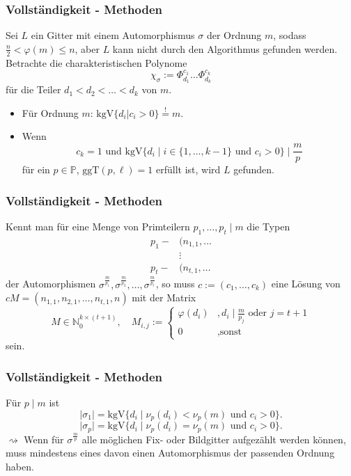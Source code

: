 \documentclass{beamer}
\newcommand{\N}{\mathbb{N}}
\renewcommand{\P}{\mathbb{P}}
\newcommand{\ggT}{\text{ggT}}
\newcommand{\kgV}{\text{kgV}}
\begin{document}
\begin{frame}[plain]
	\frametitle{Vollständigkeit - Methoden}
	Sei $L$ ein Gitter mit einem Automorphismus $\sigma$ der Ordnung $m$, sodass $\frac{n}{2} < \varphi(m) \leq n$, aber $L$ kann nicht durch den Algorithmus gefunden werden.\\
	\pause
	Betrachte die charakteristischen Polynome
	\[\chi_\sigma := \Phi_{d_1}^{c_1} \dots \Phi_{d_k}^{c_k} \]
	für die Teiler $d_1 < d_2 < \dots < d_k$ von $m$.\\
	\pause
	\begin{itemize}
		\item Für Ordnung $m$: $\kgV\lbrace d_i \vert c_i > 0 \rbrace \stackrel{!}{=} m$.\\
		\pause
		\item Wenn
	 		\[c_k = 1 \text{ und } \kgV \lbrace d_i \mid i \in \lbrace 1, \dots, k-1 \rbrace \text{ und } c_i > 0 \rbrace \mid \frac{m}{p}\]
			für ein $p \in \P$, $\ggT(p, \ell) = 1$ erfüllt ist, wird $L$ gefunden.
	\end{itemize}
\end{frame}

\begin{frame}[plain]
	\frametitle{Vollständigkeit - Methoden}
	Kennt man für eine Menge von Primteilern $p_1, \dots, p_t \mid m$ die Typen
	\begin{align*}
		p_1 - &(n_{1,1}, \dots\\
		&\vdots\\
		p_t - &(n_{t,1}, \dots
	\end{align*}
	der Automorphismen $\sigma^\frac{m}{p_1}, \sigma^\frac{m}{p_2}, \dots, \sigma^\frac{m}{p_t}$, so muss $c := (c_1, \dots, c_k)$ eine Lösung von $c M= (n_{1,1}, n_{2,1}, \dots, n_{t,1}, n)$ mit der Matrix
	\[M \in \N_0^{k \times (t+1)}, \quad M_{i,j} := \begin{cases} \varphi(d_i)	&, d_i \mid \frac{m}{p_j} \text{ oder } j = t+1\\ 0 &, \text{sonst}\end{cases}\]
sein.
\end{frame}

\begin{frame}[plain]
	\frametitle{Vollständigkeit - Methoden}
	Für $p \mid m$ ist 
	\[\vert \sigma_1 \vert = \kgV \lbrace d_i \mid \nu_p(d_i) < \nu_p(m) \text{ und } c_i > 0 \rbrace.\]
	\[\vert \sigma_p \vert = \kgV \lbrace d_i \mid \nu_p(d_i) = \nu_p(m) \text{ und } c_i > 0 \rbrace.\]
	\pause
	$\rightsquigarrow$ Wenn für $\sigma^\frac{m}{p}$ alle möglichen Fix- oder Bildgitter aufgezählt werden können, muss mindestens eines davon einen Automorphismus der passenden Ordnung haben.
\end{frame}
\end{document}
